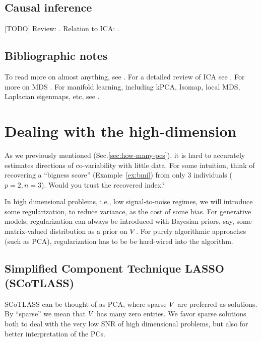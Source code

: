 \documentclass[12pt,a4paper]{article}
\begin{document}
\subsection{Causal inference}
[TODO]
Review: \cite{kalisch2014causal}.
Relation to ICA: \cite{peters2014causal}.





\subsection{Bibliographic notes}
To read more on almost anything, see \citet{friedman2001elements}.
For a detailed review of ICA see \cite{hyvarinen2000independent}. 
For more on MDS \cite{borg2005modern}.
For manifold learning, including kPCA, Isomap, local MDS, Laplacian eigenmaps, etc, see \citet{mohri2012foundations}.








\section{Dealing with the high-dimension}

As we previously mentioned (Sec.\ref{sec:how-many-pcs}), it is hard to accurately estimates directions of co-variability with little data. 
For some intuition, think of recovering a ``bigness score'' (Example~\ref{ex:bmi}) from only 3 individuals ($p=2,n=3$). 
Would you trust the recovered index?

In high dimensional problems, i.e., low signal-to-noise regimes, we will introduce some regularization, to reduce variance, as the cost of some bias. 
For generative models, regularization can always be introduced with Bayesian priors, say, some matrix-valued distribution as a prior on $V$. 
For purely algorithmic approaches (such as PCA), regularization has to be be hard-wired into the algorithm.





\subsection{Simplified Component Technique LASSO (SCoTLASS)}

SCoTLASS can be thought of as PCA, where sparse $V$ are preferred as solutions.
By ``sparse'' we mean that $V$ has many zero entries. 
We favor sparse solutions both to deal with the very low SNR of high dimensional problems, but also for better interpretation of the PCs.
\end{document}
